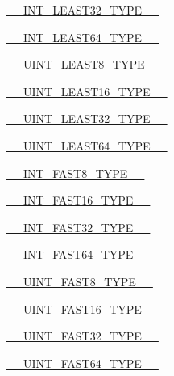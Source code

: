 \begin{DoxyCompactItemize}
\item 
\hyperlink{CMakeCache_8txt_a2bf5f979cc9392d0cf97a14d736d628a}{\+\_\+\+\_\+\+I\+N\+T\+\_\+\+L\+E\+A\+S\+T32\+\_\+\+T\+Y\+P\+E\+\_\+\+\_\+}
\item 
\hyperlink{CMakeCache_8txt_acaedfaa861fcf2ab2ed6fef67d552001}{\+\_\+\+\_\+\+I\+N\+T\+\_\+\+L\+E\+A\+S\+T64\+\_\+\+T\+Y\+P\+E\+\_\+\+\_\+}
\item 
\hyperlink{CMakeCache_8txt_a2a5868ec6fe252f426662079d5187d04}{\+\_\+\+\_\+\+U\+I\+N\+T\+\_\+\+L\+E\+A\+S\+T8\+\_\+\+T\+Y\+P\+E\+\_\+\+\_\+}
\item 
\hyperlink{CMakeCache_8txt_a0cf7166f2026cc52431a063b5f16caa7}{\+\_\+\+\_\+\+U\+I\+N\+T\+\_\+\+L\+E\+A\+S\+T16\+\_\+\+T\+Y\+P\+E\+\_\+\+\_\+}
\item 
\hyperlink{CMakeCache_8txt_a2b66f33976e9bc55e27367e3b1448e40}{\+\_\+\+\_\+\+U\+I\+N\+T\+\_\+\+L\+E\+A\+S\+T32\+\_\+\+T\+Y\+P\+E\+\_\+\+\_\+}
\item 
\hyperlink{CMakeCache_8txt_afb89ddd568254fb1f9e5eeb6fdb13d0b}{\+\_\+\+\_\+\+U\+I\+N\+T\+\_\+\+L\+E\+A\+S\+T64\+\_\+\+T\+Y\+P\+E\+\_\+\+\_\+}
\item 
\hyperlink{CMakeCache_8txt_a200c99a73bb9894a85b11b122e3e26d0}{\+\_\+\+\_\+\+I\+N\+T\+\_\+\+F\+A\+S\+T8\+\_\+\+T\+Y\+P\+E\+\_\+\+\_\+}
\item 
\hyperlink{CMakeCache_8txt_a0c08f8106efbb6105db009f25e8d8664}{\+\_\+\+\_\+\+I\+N\+T\+\_\+\+F\+A\+S\+T16\+\_\+\+T\+Y\+P\+E\+\_\+\+\_\+}
\item 
\hyperlink{CMakeCache_8txt_ae5117fe8af2968c8df646c90f5eb24d4}{\+\_\+\+\_\+\+I\+N\+T\+\_\+\+F\+A\+S\+T32\+\_\+\+T\+Y\+P\+E\+\_\+\+\_\+}
\item 
\hyperlink{CMakeCache_8txt_a7ed6af681304005196de13467b9442d5}{\+\_\+\+\_\+\+I\+N\+T\+\_\+\+F\+A\+S\+T64\+\_\+\+T\+Y\+P\+E\+\_\+\+\_\+}
\item 
\hyperlink{CMakeCache_8txt_a41340f1e822a8ea4d6994bba627339fd}{\+\_\+\+\_\+\+U\+I\+N\+T\+\_\+\+F\+A\+S\+T8\+\_\+\+T\+Y\+P\+E\+\_\+\+\_\+}
\item 
\hyperlink{CMakeCache_8txt_a2231ce950df5d5eaf1dc88cb718b4569}{\+\_\+\+\_\+\+U\+I\+N\+T\+\_\+\+F\+A\+S\+T16\+\_\+\+T\+Y\+P\+E\+\_\+\+\_\+}
\item 
\hyperlink{CMakeCache_8txt_ad5e5c8a8bb834a4f9d47edfe6ec88204}{\+\_\+\+\_\+\+U\+I\+N\+T\+\_\+\+F\+A\+S\+T32\+\_\+\+T\+Y\+P\+E\+\_\+\+\_\+}
\item 
\hyperlink{CMakeCache_8txt_aa588b63d52e2735c82b0262ae2034b2e}{\+\_\+\+\_\+\+U\+I\+N\+T\+\_\+\+F\+A\+S\+T64\+\_\+\+T\+Y\+P\+E\+\_\+\+\_\+}
\item 

\end{DoxyCompactItemize}
